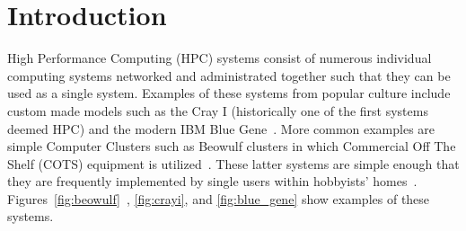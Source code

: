 \documentclass[oneside,12pt]{memoir}
\begin{document}
\tableofcontents

\listoffigures

\mainmatter
\pagestyle{asu} 

\chapter{Introduction}
\label{chap:introduction}
High Performance Computing (HPC) systems consist of numerous individual computing systems networked and administrated together such that they can be used as a single system. Examples of these systems from popular culture include custom made models such as the Cray I (historically one of the first systems deemed HPC) and the modern IBM Blue Gene~\cite{leavitt2012big}. More common examples are simple Computer Clusters such as Beowulf clusters in which Commercial Off The Shelf (COTS) equipment is utilized~\cite{buyya1999high}. These latter systems are simple enough that they are frequently implemented by single users within hobbyists' homes~\cite{brown2004engineering}. Figures~\ref{fig:beowulf}~, \ref{fig:crayi}, and \ref{fig:blue_gene} show examples of these systems.
\end{document}
